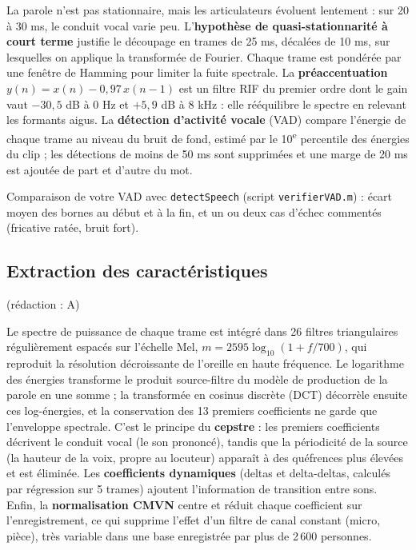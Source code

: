 \documentclass[11pt,a4paper]{article}
\newcommand{\redaction}[1]{\hfill{\small\color{gray}(rédaction : #1)}}   %
\begin{document}
La parole n'est pas stationnaire, mais les articulateurs évoluent lentement : sur 20 à 30 ms, le conduit vocal varie peu. L'\textbf{hypothèse de quasi-stationnarité à court terme} justifie le découpage en trames de 25 ms, décalées de 10 ms, sur lesquelles on applique la transformée de Fourier. Chaque trame est pondérée par une fenêtre de Hamming pour limiter la fuite spectrale. La \textbf{préaccentuation} $y(n) = x(n) - 0{,}97\,x(n-1)$ est un filtre RIF du premier ordre dont le gain vaut $-30{,}5$ dB à 0 Hz et $+5{,}9$ dB à 8 kHz : elle rééquilibre le spectre en relevant les formants aigus. La \textbf{détection d'activité vocale} (VAD) compare l'énergie de chaque trame au niveau du bruit de fond, estimé par le 10\textsuperscript{e} percentile des énergies du clip ; les détections de moins de 50 ms sont supprimées et une marge de 20 ms est ajoutée de part et d'autre du mot.

\begin{aremplir}
Comparaison de votre VAD avec \texttt{detectSpeech} (script \texttt{verifierVAD.m}) : écart moyen des bornes au début et à la fin, et un ou deux cas d'échec commentés (fricative ratée, bruit fort).
\end{aremplir}

\subsection{Extraction des caractéristiques}\redaction{A}

Le spectre de puissance de chaque trame est intégré dans 26 filtres triangulaires régulièrement espacés sur l'échelle Mel, $m = 2595 \log_{10}(1 + f/700)$, qui reproduit la résolution décroissante de l'oreille en haute fréquence. Le logarithme des énergies transforme le produit source-filtre du modèle de production de la parole en une somme ; la transformée en cosinus discrète (DCT) décorrèle ensuite ces log-énergies, et la conservation des 13 premiers coefficients ne garde que l'enveloppe spectrale. C'est le principe du \textbf{cepstre} : les premiers coefficients décrivent le conduit vocal (le son prononcé), tandis que la périodicité de la source (la hauteur de la voix, propre au locuteur) apparaît à des quéfrences plus élevées et est éliminée. Les \textbf{coefficients dynamiques} (deltas et delta-deltas, calculés par régression sur 5 trames) ajoutent l'information de transition entre sons. Enfin, la \textbf{normalisation CMVN} centre et réduit chaque coefficient sur l'enregistrement, ce qui supprime l'effet d'un filtre de canal constant (micro, pièce), très variable dans une base enregistrée par plus de 2\,600 personnes.
\end{document}
